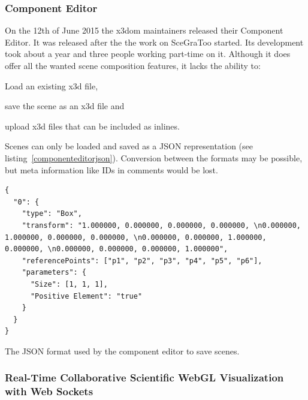 \clearpage

\subsubsection{Component Editor}
\label{component-editor30}

On the 12th of June 2015 the x3dom maintainers released their Component Editor. \cite{componenteditor}
It was released after the the work on SceGraToo started.
Its development took about a year and three people working part-time on it. \cite{componenteditoreffort}
Although it does offer all the wanted scene composition features, it lacks the ability to:

\begin{itemize*}
  \item Load an existing x3d file,
  \item save the scene as an x3d file and
  \item upload x3d files that can be included as inlines.
\end{itemize*}

Scenes can only be loaded and saved as a JSON representation (see listing~\ref{componenteditorjson}).
Conversion between the formats may be possible, but meta information like IDs in comments would be lost.

\begin{listing}
  \begin{verbatim}
{
  "0": {
    "type": "Box",
    "transform": "1.000000, 0.000000, 0.000000, 0.000000, \n0.000000, 1.000000, 0.000000, 0.000000, \n0.000000, 0.000000, 1.000000, 0.000000, \n0.000000, 0.000000, 0.000000, 1.000000",
    "referencePoints": ["p1", "p2", "p3", "p4", "p5", "p6"],
    "parameters": {
      "Size": [1, 1, 1],
      "Positive Element": "true"
    }
  }
}
  \end{verbatim}
  \caption{The JSON format used by the component editor to save scenes.}
  \label{componenteditorjson}
\end{listing}

\subsubsection{Real-Time Collaborative Scientific WebGL Visualization with Web Sockets}
\label{rtcswvwws}

